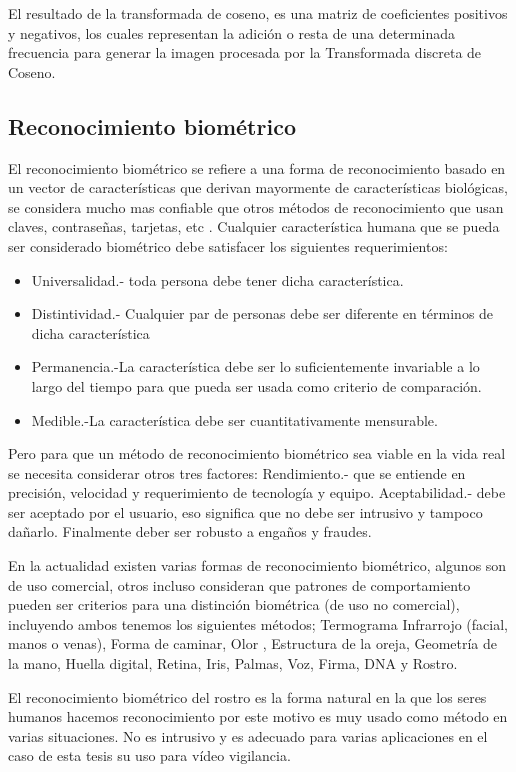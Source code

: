 El resultado de la transformada de coseno, es una matriz de coeficientes positivos y negativos, los cuales representan la adición o resta de una determinada frecuencia para generar la imagen procesada por la Transformada discreta de Coseno.

\subsection{Reconocimiento biométrico}
El reconocimiento biométrico se refiere a una forma de reconocimiento basado en un vector de características que derivan mayormente de características biológicas, se considera mucho mas confiable que otros métodos de reconocimiento que usan claves, contraseñas, tarjetas, etc \cite{alice2003biometric}.
Cualquier característica humana que se pueda ser considerado biométrico debe satisfacer los siguientes requerimientos:
\begin{itemize}
\item Universalidad.- toda persona debe tener dicha característica.
\item Distintividad.- Cualquier par de personas debe ser diferente en términos de dicha característica
\item Permanencia.-La característica debe ser lo suficientemente invariable a lo largo del tiempo para que pueda ser usada como criterio de comparación.
\item Medible.-La característica debe ser cuantitativamente mensurable.
\end{itemize}

Pero para que un método de reconocimiento biométrico sea viable en la vida real se necesita considerar otros tres factores:
Rendimiento.- que se entiende en precisión, velocidad y requerimiento de tecnología y equipo.
Aceptabilidad.- debe ser aceptado por el usuario, eso significa que no debe ser intrusivo y tampoco dañarlo.
Finalmente deber ser robusto a engaños y fraudes.

En la actualidad existen varias formas de reconocimiento biométrico, algunos son de uso comercial, otros incluso consideran que patrones de comportamiento pueden ser criterios para una distinción biométrica (de uso no comercial), incluyendo ambos tenemos los siguientes métodos\cite{delac2004survey}; Termograma Infrarrojo (facial, manos o venas), Forma de caminar, Olor , Estructura de la oreja, Geometría de la mano, Huella digital, Retina, Iris, Palmas, Voz, Firma, DNA y Rostro.

El reconocimiento biométrico del rostro es la forma natural en la que los seres humanos hacemos reconocimiento por este motivo es muy usado como método en varias situaciones. No es intrusivo y es adecuado para varias aplicaciones en el caso de esta tesis su uso para vídeo vigilancia.

